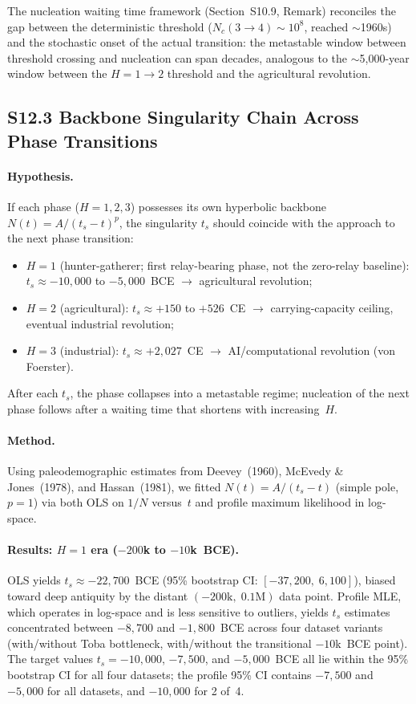 \documentclass[11pt]{article}
\begin{document}
The nucleation waiting time framework (Section~S10.9, Remark) reconciles the gap between the deterministic threshold ($N_c(3 \to 4) \sim 10^8$, reached $\sim$1960s) and the stochastic onset of the actual transition: the metastable window between threshold crossing and nucleation can span decades, analogous to the $\sim$5,000-year window between the $H = 1 \to 2$ threshold and the agricultural revolution.

\subsection*{S12.3 Backbone Singularity Chain Across Phase Transitions}

\paragraph{Hypothesis.}
If each phase ($H = 1, 2, 3$) possesses its own hyperbolic backbone $N(t) = A/(t_s - t)^p$, the singularity $t_s$ should coincide with the approach to the next phase transition:
\begin{itemize}
  \item $H = 1$ (hunter-gatherer; first relay-bearing phase, not the zero-relay baseline): $t_s \approx -10{,}000$ to $-5{,}000$~BCE $\to$ agricultural revolution;
  \item $H = 2$ (agricultural): $t_s \approx +150$ to $+526$~CE $\to$ carrying-capacity ceiling, eventual industrial revolution;
  \item $H = 3$ (industrial): $t_s \approx +2{,}027$~CE $\to$ AI/computational revolution (von Foerster).
\end{itemize}
After each $t_s$, the phase collapses into a metastable regime; nucleation of the next phase follows after a waiting time that shortens with increasing~$H$.

\paragraph{Method.}
Using paleodemographic estimates from Deevey~(1960), McEvedy \& Jones~(1978), and Hassan~(1981), we fitted $N(t) = A/(t_s - t)$ (simple pole, $p = 1$) via both OLS on $1/N$ versus~$t$ and profile maximum likelihood in log-space.

\paragraph{Results: $H = 1$ era ($-200$k to $-10$k~BCE).}
OLS yields $t_s \approx -22{,}700$~BCE (95\% bootstrap CI: $[-37{,}200, \; 6{,}100]$), biased toward deep antiquity by the distant $(-200\text{k}, \; 0.1\text{M})$ data point.  Profile MLE, which operates in log-space and is less sensitive to outliers, yields $t_s$ estimates concentrated between $-8{,}700$ and $-1{,}800$~BCE across four dataset variants (with/without Toba bottleneck, with/without the transitional $-10$k~BCE point).  The target values $t_s = -10{,}000$, $-7{,}500$, and $-5{,}000$~BCE all lie within the 95\% bootstrap CI for all four datasets; the profile 95\% CI contains $-7{,}500$ and $-5{,}000$ for all datasets, and $-10{,}000$ for 2 of~4.
\end{document}
